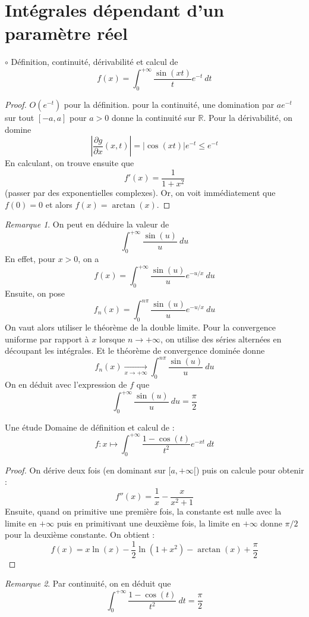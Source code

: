 \documentclass[french,a4paper]{article}
\newcommand{\R}{\mathbb{R}}
\theoremstyle{plain}
\theoremstyle{definition}
\theoremstyle{remark}
\newtheorem*{rmq}{Remarque}
\begin{document}
\section{Intégrales dépendant d'un paramètre réel}
\begin{ex}[Moulin.IP.18]{$\circ$}
	Définition, continuité, dérivabilité et calcul de $$f(x)=\int_{0}^{+\infty}\frac{\sin(xt)}{t}e^{-t}\ dt$$
\end{ex}
\begin{proof}
	$O(e^{-t})$ pour la définition. pour la continuité, une domination par $ae^{-t}$ sur tout $[-a,a]$ pour $a>0$ donne la continuité sur $\R$. Pour la dérivabilité, on domine $$\left\lvert\frac{\partial g}{\partial x}(x,t)\right\rvert=\lvert \cos(xt)\rvert e^{-t}\leqslant e^{-t}$$ En calculant, on trouve ensuite que $$f'(x)=\frac{1}{1+x^2}$$ (passer par des exponentielles complexes). Or, on voit immédiatement que $f(0)=0$ et alors $f(x)=\arctan(x)$.
\end{proof}
\begin{rmq}
	On peut en déduire la valeur de $$\int_{0}^{+\infty}\frac{\sin(u)}{u}\ du$$ En effet, pour $x>0$, on a $$f(x)=\int_{0}^{+\infty}\frac{\sin(u)}{u}e^{-u/x}\ du$$ Ensuite, on pose $$f_n(x)=\int_{0}^{n\pi}\frac{\sin(u)}{u}e^{-u/x}\ du$$ On vaut alors utiliser le théorème de la double limite. Pour la convergence uniforme par rapport à $x$ lorsque $n\to+\infty$, on utilise des séries alternées en découpant les intégrales. Et le théorème de convergence dominée donne $$f_n(x)\xrightarrow[x\to+\infty]{}\int_{0}^{n\pi}\frac{\sin(u)}{u}\ du$$ On en déduit avec l'expression de $f$ que $$\int_{0}^{+\infty}\frac{\sin(u)}{u}\ du=\frac{\pi}{2}$$
\end{rmq}
\begin{ex}[Moulin.IP.19]{Une étude}
	Domaine de définition et calcul de : $$f:x\mapsto\int_{0}^{+\infty}\frac{1-\cos(t)}{t^2}e^{-xt}\ dt$$
\end{ex}
\begin{proof}
	On dérive deux fois (en dominant sur $[a,+\infty[$) puis on calcule pour obtenir : $$f''(x)=\frac{1}{x}-\frac{x}{x^2+1}$$ Ensuite, quand on primitive une première fois, la constante est nulle avec la limite en $+\infty$ puis en primitivant une deuxième fois, la limite en $+\infty$ donne $\pi/2$ pour la deuxième constante. On obtient : $$f(x)=x\ln(x)-\frac{1}{2}\ln(1+x^2)-\arctan(x)+\frac{\pi}{2}$$
\end{proof}
\begin{rmq}
	Par continuité, on en déduit que $$\int_{0}^{+\infty}\frac{1-\cos(t)}{t^2}\ dt=\frac{\pi}{2}$$
\end{rmq}
\end{document}
